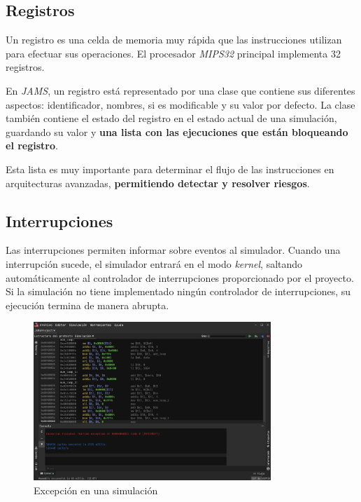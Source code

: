 \subsection{Registros}\label{subsec:registros}

Un registro es una celda de memoria muy rápida que las instrucciones
utilizan para efectuar sus operaciones.
El procesador \textit{MIPS32} principal implementa 32 registros.

\noindent En \textit{JAMS}, un registro está representado por
una clase que contiene sus diferentes aspectos: identificador, nombres,
si es modificable y su valor por defecto.
La clase también contiene el estado del registro en el estado
actual de una simulación, guardando su valor y
\textbf{una lista con las ejecuciones que están bloqueando el registro}.

\noindent Esta lista es muy importante para determinar el flujo de
las instrucciones en arquitecturas avanzadas, \textbf{permitiendo
detectar y resolver riesgos}.

\subsection{Interrupciones}\label{subsec:interrupciones}

Las interrupciones permiten informar sobre eventos al
simulador.
Cuando una interrupción sucede, el simulador entrará en el
modo \textit{kernel}, saltando automáticamente al controlador
de interrupciones proporcionado por el proyecto.
Si la simulación no tiene implementado ningún controlador de
interrupciones, su ejecución termina de manera abrupta.

\begin{figure}[H]
    \centering
    \includegraphics[width=0.8\textwidth]{images/mips/jams-exception}
    \caption{Excepción en una simulación}
    \label{fig:jams-exception}
\end{figure}

